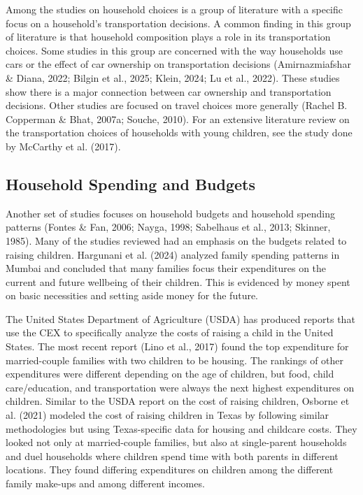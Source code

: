 \documentclass[
]{agujournal2019}
\begin{document}
Among the studies on household choices is a group of literature with a
specific focus on a household's transportation decisions. A common
finding in this group of literature is that household composition plays
a role in its transportation choices. Some studies in this group are
concerned with the way households use cars or the effect of car
ownership on transportation decisions (Amirnazmiafshar \& Diana, 2022;
Bilgin et al., 2025; Klein, 2024; Lu et al., 2022). These studies show
there is a major connection between car ownership and transportation
decisions. Other studies are focused on travel choices more generally
(Rachel B. Copperman \& Bhat, 2007a; Souche, 2010). For an extensive
literature review on the transportation choices of households with young
children, see the study done by McCarthy et al. (2017).

\subsection{Household Spending and
Budgets}\label{household-spending-and-budgets}

Another set of studies focuses on household budgets and household
spending patterns (Fontes \& Fan, 2006; Nayga, 1998; Sabelhaus et al.,
2013; Skinner, 1985). Many of the studies reviewed had an emphasis on
the budgets related to raising children. Hargunani et al. (2024)
analyzed family spending patterns in Mumbai and concluded that many
families focus their expenditures on the current and future wellbeing of
their children. This is evidenced by money spent on basic necessities
and setting aside money for the future.

The United States Department of Agriculture (USDA) has produced reports
that use the CEX to specifically analyze the costs of raising a child in
the United States. The most recent report (Lino et al., 2017) found the
top expenditure for married-couple families with two children to be
housing. The rankings of other expenditures were different depending on
the age of children, but food, child care/education, and transportation
were always the next highest expenditures on children. Similar to the
USDA report on the cost of raising children, Osborne et al. (2021)
modeled the cost of raising children in Texas by following similar
methodologies but using Texas-specific data for housing and childcare
costs. They looked not only at married-couple families, but also at
single-parent households and duel households where children spend time
with both parents in different locations. They found differing
expenditures on children among the different family make-ups and among
different incomes.
\end{document}
